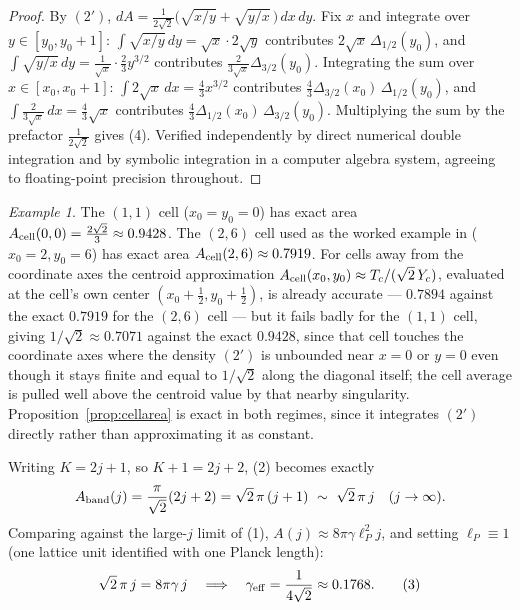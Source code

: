 \documentclass[11pt]{amsart}
\theoremstyle{remark}
\newtheorem*{example}{Example}
\begin{document}
\begin{proof}
By $(2')$, $dA=\frac1{2\sqrt2}\big(\sqrt{x/y}+\sqrt{y/x}\,\big)\,dx\,dy$. Fix $x$ and integrate over $y\in[y_0,y_0+1]$: $\int\sqrt{x/y}\,dy=\sqrt x\cdot2\sqrt y$ contributes $2\sqrt x\,\Delta_{1/2}(y_0)$, and $\int\sqrt{y/x}\,dy=\tfrac1{\sqrt x}\cdot\tfrac23y^{3/2}$ contributes $\tfrac2{3\sqrt x}\Delta_{3/2}(y_0)$. Integrating the sum over $x\in[x_0,x_0+1]$: $\int2\sqrt x\,dx=\tfrac43x^{3/2}$ contributes $\tfrac43\Delta_{3/2}(x_0)\,\Delta_{1/2}(y_0)$, and $\int\tfrac2{3\sqrt x}\,dx=\tfrac43\sqrt x$ contributes $\tfrac43\Delta_{1/2}(x_0)\,\Delta_{3/2}(y_0)$. Multiplying the sum by the prefactor $\tfrac1{2\sqrt2}$ gives (4). Verified independently by direct numerical double integration and by symbolic integration in a computer algebra system, agreeing to floating-point precision throughout.
\end{proof}

\begin{example}
The $(1,1)$ cell ($x_0=y_0=0$) has exact area $A_{\rm cell}(0,0)=\tfrac{2\sqrt2}3\approx0.9428$. The $(2,6)$ cell used as the worked example in \cite{Ebert2026Table} ($x_0=2,y_0=6$) has exact area $A_{\rm cell}(2,6)\approx0.7919$. For cells away from the coordinate axes the centroid approximation $A_{\rm cell}(x_0,y_0)\approx T_c/(\sqrt2\,Y_c)$, evaluated at the cell's own center $(x_0+\tfrac12,y_0+\tfrac12)$, is already accurate --- $0.7894$ against the exact $0.7919$ for the $(2,6)$ cell --- but it fails badly for the $(1,1)$ cell, giving $1/\sqrt2\approx0.7071$ against the exact $0.9428$, since that cell touches the coordinate axes where the density $(2')$ is unbounded near $x=0$ or $y=0$ even though it stays finite and equal to $1/\sqrt2$ along the diagonal itself; the cell average is pulled well above the centroid value by that nearby singularity. Proposition~\ref{prop:cellarea} is exact in both regimes, since it integrates $(2')$ directly rather than approximating it as constant.
\end{example}

Writing $K=2j+1$, so $K+1=2j+2$, (2) becomes exactly
\[
A_{\rm band}(j)=\frac{\pi}{\sqrt2}(2j+2)=\sqrt2\,\pi\,(j+1)\ \sim\ \sqrt2\,\pi\,j\quad(j\to\infty).
\]
Comparing against the large-$j$ limit of (1), $A(j)\approx8\pi\gamma\ell_P^2j$, and
setting $\ell_P\equiv1$ (one lattice unit identified with one Planck length):
\begin{equation}
\sqrt2\,\pi\,j = 8\pi\gamma\,j \quad\Longrightarrow\quad \gamma_{\rm eff}=\frac1{4\sqrt2}\approx0.1768. \tag{3}
\end{equation}
\end{document}
